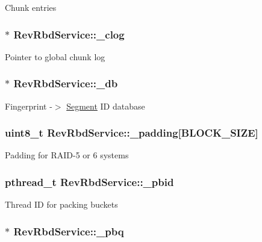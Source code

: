 \-Chunk entries \hypertarget{structRevRbdService_a561761326f6c87f2cc091a9ecf7cc791}{
\subsubsection[{\-\_\-clog}]{$\ast$ {\bf \-Rev\-Rbd\-Service\-::\-\_\-clog}}}\label{structRevRbdService_a561761326f6c87f2cc091a9ecf7cc791}
\-Pointer to global chunk log \hypertarget{structRevRbdService_a59cc8867465a33e67d00056131dc6978}{
\subsubsection[{\-\_\-db}]{$\ast$ {\bf \-Rev\-Rbd\-Service\-::\-\_\-db}}}\label{structRevRbdService_a59cc8867465a33e67d00056131dc6978}
\-Fingerprint -\/$>$ \hyperlink{structSegment}{\-Segment} \-I\-D database \hypertarget{structRevRbdService_ab230216146da706c857f624be7a73230}{
\subsubsection[{\-\_\-padding}]{\setlength{\rightskip}{0pt plus 5cm}uint8\-\_\-t {\bf \-Rev\-Rbd\-Service\-::\-\_\-padding}\mbox{[}{\bf \-B\-L\-O\-C\-K\-\_\-\-S\-I\-Z\-E}\mbox{]}}}\label{structRevRbdService_ab230216146da706c857f624be7a73230}
\-Padding for \-R\-A\-I\-D-\/5 or 6 systems \hypertarget{structRevRbdService_ab34a1bcdcea1dac8a7fceaf6d811df7b}{
\subsubsection[{\-\_\-pbid}]{\setlength{\rightskip}{0pt plus 5cm}pthread\-\_\-t {\bf \-Rev\-Rbd\-Service\-::\-\_\-pbid}}}\label{structRevRbdService_ab34a1bcdcea1dac8a7fceaf6d811df7b}
\-Thread \-I\-D for packing buckets \hypertarget{structRevRbdService_a2b03ba1799bc5b0749633860e265d9b6}{
\subsubsection[{\-\_\-pbq}]{$\ast$ {\bf \-Rev\-Rbd\-Service\-::\-\_\-pbq}}}\label{structRevRbdService_a2b03ba1799bc5b0749633860e265d9b6}
